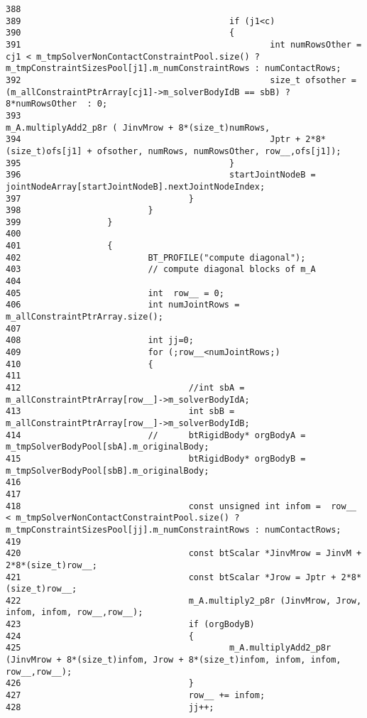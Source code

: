 \begin{Code}
\begin{verbatim}
388 
389                                         if (j1<c)
390                                         {
391                                                 int numRowsOther =  cj1 < m_tmpSolverNonContactConstraintPool.size() ? m_tmpConstraintSizesPool[j1].m_numConstraintRows : numContactRows;
392                                                 size_t ofsother = (m_allConstraintPtrArray[cj1]->m_solverBodyIdB == sbB) ? 8*numRowsOther  : 0;
393                                                 m_A.multiplyAdd2_p8r ( JinvMrow + 8*(size_t)numRows, 
394                                                 Jptr + 2*8*(size_t)ofs[j1] + ofsother, numRows, numRowsOther, row__,ofs[j1]);
395                                         }
396                                         startJointNodeB = jointNodeArray[startJointNodeB].nextJointNodeIndex;
397                                 }
398                         }
399                 }
400 
401                 {
402                         BT_PROFILE("compute diagonal");
403                         // compute diagonal blocks of m_A
404 
405                         int  row__ = 0;
406                         int numJointRows = m_allConstraintPtrArray.size();
407 
408                         int jj=0;
409                         for (;row__<numJointRows;)
410                         {
411 
412                                 //int sbA = m_allConstraintPtrArray[row__]->m_solverBodyIdA;
413                                 int sbB = m_allConstraintPtrArray[row__]->m_solverBodyIdB;
414                         //      btRigidBody* orgBodyA = m_tmpSolverBodyPool[sbA].m_originalBody;
415                                 btRigidBody* orgBodyB = m_tmpSolverBodyPool[sbB].m_originalBody;
416 
417 
418                                 const unsigned int infom =  row__ < m_tmpSolverNonContactConstraintPool.size() ? m_tmpConstraintSizesPool[jj].m_numConstraintRows : numContactRows;
419                                 
420                                 const btScalar *JinvMrow = JinvM + 2*8*(size_t)row__;
421                                 const btScalar *Jrow = Jptr + 2*8*(size_t)row__;
422                                 m_A.multiply2_p8r (JinvMrow, Jrow, infom, infom, row__,row__);
423                                 if (orgBodyB) 
424                                 {
425                                         m_A.multiplyAdd2_p8r (JinvMrow + 8*(size_t)infom, Jrow + 8*(size_t)infom, infom, infom,  row__,row__);
426                                 }
427                                 row__ += infom;
428                                 jj++;

\end{verbatim}
\end{Code}
